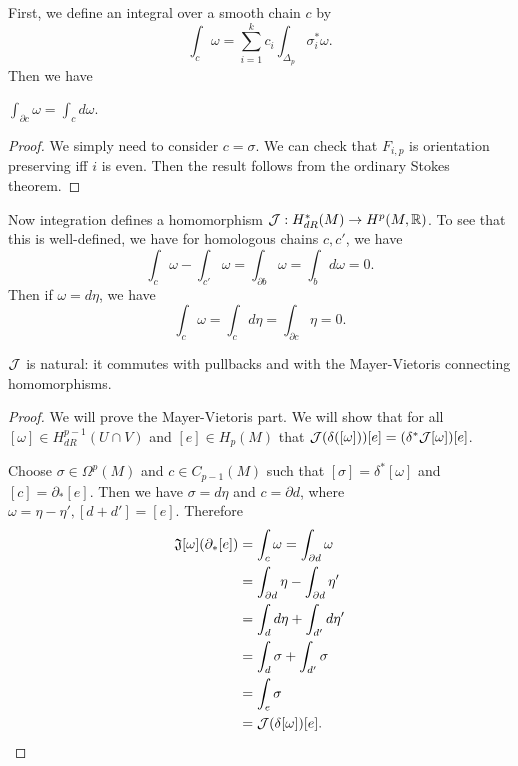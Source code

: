 \documentclass[twoside, 10pt]{article}
\begin{document}
    First, we define an integral over a smooth chain $c$ by
    \[ \int_c \omega = \sum_{i=1}^k c_i \int_{\Delta_p} \sigma_i^* \omega.\]
    Then we have
    \begin{thm}[Stokes]
        $\int_{ \partial c } \omega = \int_c d\omega$.
    \end{thm}

    \begin{proof}
        We simply need to consider $c = \sigma$. We can check that $F_{i,p}$ is orientation preserving iff $i$ is even. Then the result follows from the ordinary Stokes theorem.
    \end{proof}

    Now integration defines a homomorphism $\mathcal{J}: H^*_{dR}(M) \to H^p(M, \mathbb{R})$. To see that this is well-defined, we have for homologous chains $c, c'$, we have
    \[ \int_c \omega - \int_{c'} \omega = \int_{\partial b} \omega = \int_b d\omega = 0.\]
    Then if $\omega = d\eta$, we have 
    \[\int_c \omega = \int_c d\eta = \int_{\partial c} \eta = 0.\]

    \begin{lem}
        $\mathcal{J}$ is natural: it commutes with pullbacks and with the Mayer-Vietoris connecting homomorphisms.
    \end{lem}

    \begin{proof}
        We will prove the Mayer-Vietoris part. We will show that for all $[\omega] \in H^{p-1}_{dR}(U \cap V)$ and $[e] \in H_p(M)$ that $\mathcal{J}(\delta([\omega]))[e] = ( \delta^*\mathcal{J}[\omega] )[e]$.

        Choose $\sigma \in \Omega^p(M)$ and $c \in C_{p-1}(M)$ such that $[\sigma] = \delta^*[\omega]$ and $[c] = \partial_*[e]$. Then we have $\sigma = d\eta$ and $c = \partial d$, where $\omega = \eta - \eta', [d+d'] = [e]$. Therefore 
        \begin{align*}
            \mathfrak{J}[\omega](\partial_* [e]) &= \int_c \omega = \int_{\partial d} \omega \\
                                           &= \int_{\partial d} \eta - \int_{\partial d} \eta' \\ 
                                           &= \int_d d\eta + \int_{d'} d\eta' \\ 
                                           &= \int_d \sigma + \int_{d'} \sigma \\
                                           &= \int_e \sigma \\
                                           &= \mathcal{J}(\delta[\omega])[e]. \qedhere
        \end{align*}
    \end{proof}
\end{document}
